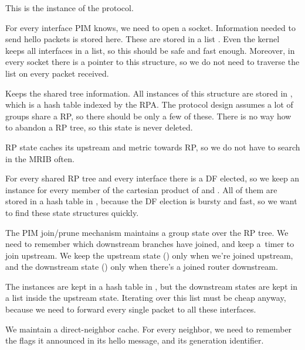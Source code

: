 \begin{description}[style=nextline]
\item[\ttt{pim\_proto}]
  This is the instance of the protocol.

\item[\ttt{pim\_iface}]
  For every interface PIM knows, we need to open a socket. Information needed
  to send hello packets is stored here. These are stored in a list
  . Even the kernel keeps all interfaces in a list, so
  this should be safe and fast enough. Moreover, in every socket there is
  a pointer to this structure, so we do not need to traverse the list on every
  packet received.

\item[\ttt{pim\_rp}]
  Keeps the shared tree information. All instances of this structure are stored
  in , which is a hash table indexed by the RPA. The
  protocol design assumes a lot of groups share a RP, so there should be only
  a few of these. There is no way how to abandon a RP tree, so this state is
  never deleted.

  RP state caches its upstream and metric towards RP, so we do not have to
  search in the MRIB often.

\item[\ttt{pim\_rp\_iface}]
  For every shared RP tree and every interface there is a DF elected, so we
  keep an instance for every member of the cartesian product of  and
  . All of them are stored in a hash table in ,
  because the DF election is bursty and fast, so we want to find these state
  structures quickly.

\item[\ttt{pim\_grp}, \ttt{pim\_grp\_iface}]
  The PIM join/prune mechanism maintains a group state over the RP tree. We
  need to remember which downstream branches have joined, and keep a~timer to
  join upstream. We keep the upstream state () only when we're
  joined upstream, and the downstream state  () only when
  there's a joined router downstream.

  The  instances are kept in a hash table in , but the
  downstream states are kept in a list inside the upstream state. Iterating
  over this list must be cheap anyway, because we need to forward every single
  packet to all these interfaces.

\item[\ttt{pim\_neigh}]
  We maintain a direct-neighbor cache. For every neighbor, we need to remember
  the flags it announced in its hello message, and its generation identifier.

\end{description}

